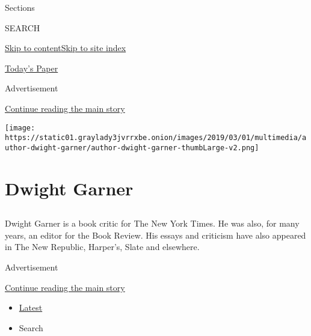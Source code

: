 Sections

SEARCH

\protect\hyperlink{site-content}{Skip to
content}\protect\hyperlink{site-index}{Skip to site index}

\href{https://myaccount.nytimes3xbfgragh.onion/auth/login?response_type=cookie\&client_id=vi}{}

\href{https://www.nytimes3xbfgragh.onion/section/todayspaper}{Today's
Paper}

Advertisement

\protect\hyperlink{after-top}{Continue reading the main story}

\texttt{[image: https://static01.graylady3jvrrxbe.onion/images/2019/03/01/multimedia/author-dwight-garner/author-dwight-garner-thumbLarge-v2.png]}

\hypertarget{dwight-garner}{%
\section{Dwight Garner}\label{dwight-garner}}

\subsection{}

Dwight Garner is a book critic for The New York Times. He was also, for
many years, an editor for the Book Review. His essays and criticism have
also appeared in The New Republic, Harper's, Slate and elsewhere.

Advertisement

\protect\hyperlink{after-mid1}{Continue reading the main story}

\begin{itemize}
\tightlist
\item
  \protect\hyperlink{stream-panel}{Latest}
\item
  Search
\end{itemize}

